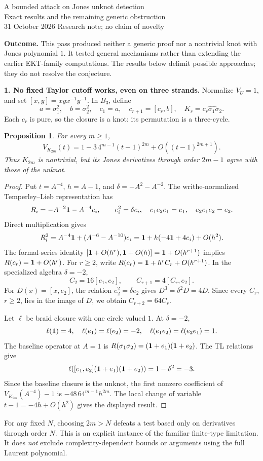 \documentclass[10pt]{article}
\newtheorem{prop}{Proposition}
\begin{document}
{\LARGE A bounded attack on Jones unknot detection}\\[3pt]
{\large Exact results and the remaining generic obstruction}\\
31 October 2026 \hfill Research note; no claim of novelty

\textbf{Outcome.} This pass produced neither a generic proof nor a nontrivial knot
with Jones polynomial \(1\). It tested general mechanisms rather than extending
the earlier EKT-family computations. The results below delimit possible
approaches; they do not resolve the conjecture.

\textbf{1. No fixed Taylor cutoff works, even on three strands.}
Normalize \(V_U=1\), and set \([x,y]=xyx^{-1}y^{-1}\).
In \(B_3\), define
\[
 a=\sigma_1^2,\quad b=\sigma_2^2,\quad
 c_1=a,\quad c_{r+1}=[c_r,b],\quad
 K_r=\widehat{c_r\sigma_1\sigma_2}.
\]
Each \(c_r\) is pure, so the closure is a knot: its permutation is a three-cycle.
\begin{prop}
For every \(m\geq1\),
\[
 V_{K_{2m}}(t)=1-3\,4^{m-1}(t-1)^{2m}
                  +O((t-1)^{2m+1}).
\]
Thus \(K_{2m}\) is nontrivial, but its Jones derivatives through order \(2m-1\)
agree with those of the unknot.
\end{prop}
\begin{proof}
Put \(t=A^{-4}\), \(h=A-1\), and \(\delta=-A^2-A^{-2}\).
The writhe-normalized Temperley--Lieb representation has
\[
 R_i=-A^{-2}\mathbf 1-A^{-4}e_i,\qquad
 e_i^2=\delta e_i,\quad e_1e_2e_1=e_1,\quad e_2e_1e_2=e_2.
\]
Direct multiplication gives
\[
 R_i^2=A^{-4}\mathbf 1+(A^{-6}-A^{-10})e_i
       =\mathbf 1+h(-4\mathbf 1+4e_i)+O(h^2).
\]
The formal-series identity
\([\mathbf 1+O(h^r),\mathbf 1+O(h)]=\mathbf 1+O(h^{r+1})\)
implies \(R(c_r)=\mathbf 1+O(h^r)\). For \(r\geq2\), write
\(R(c_r)=\mathbf 1+h^r C_r+O(h^{r+1})\). In the specialized algebra \(\delta=-2\),
\[
 C_2=16[e_1,e_2],\qquad C_{r+1}=4[C_r,e_2].
\]
For \(D(x)=[x,e_2]\), the relation \(e_2^2=\delta e_2\) gives
\(D^3=\delta^2D=4D\). Since every \(C_r\), \(r\geq2\), lies in the image of \(D\),
we obtain \(C_{r+2}=64C_r\).

Let \(\ell\) be braid closure with one circle valued \(1\).
At \(\delta=-2\),
\[
 \ell(\mathbf 1)=4,\quad\ell(e_1)=\ell(e_2)=-2,\quad
 \ell(e_1e_2)=\ell(e_2e_1)=1.
\]
The baseline operator at \(A=1\) is
\(R(\sigma_1\sigma_2)=(\mathbf 1+e_1)(\mathbf 1+e_2)\).
The TL relations give
\[
 \ell([e_1,e_2](\mathbf 1+e_1)(\mathbf 1+e_2))=1-\delta^2=-3.
\]
Since the baseline closure is the unknot, the first nonzero coefficient of
\(V_{K_{2m}}(A^{-4})-1\) is \(-48\,64^{m-1}h^{2m}\).
The local change of variable \(t-1=-4h+O(h^2)\) gives the displayed result.
\end{proof}
For any fixed \(N\), choosing \(2m>N\) defeats a test based only on derivatives
through order \(N\). This is an explicit instance of the familiar finite-type
limitation. It does \emph{not} exclude complexity-dependent bounds or arguments
using the full Laurent polynomial.
\end{document}
